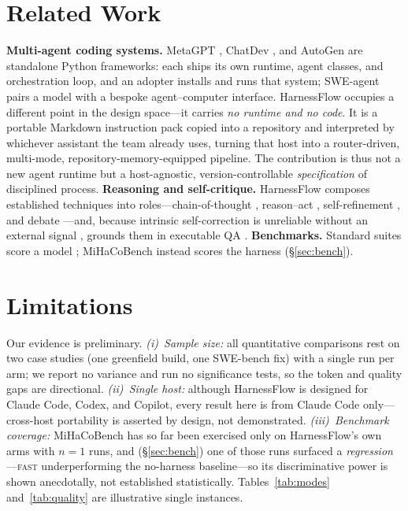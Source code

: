 \documentclass{article}
\begin{document}
\section{Related Work}

\textbf{Multi-agent coding systems.} MetaGPT \citep{hong2024metagpt}, ChatDev
\citep{qian2024chatdev}, and AutoGen \citep{wu2023autogen} are standalone Python
frameworks: each ships its own runtime, agent classes, and orchestration loop,
and an adopter installs and runs that system; SWE-agent \citep{yang2024sweagent}
pairs a model with a bespoke agent--computer interface. HarnessFlow occupies a
different point in the design space---it carries \emph{no runtime and no code}. It
is a portable Markdown instruction pack copied into a repository and interpreted
by whichever assistant the team already uses, turning that host into a
router-driven, multi-mode, repository-memory-equipped pipeline. The contribution
is thus not a new agent runtime but a host-agnostic, version-controllable
\emph{specification} of disciplined process. \textbf{Reasoning and self-critique.}
HarnessFlow composes established techniques into roles---chain-of-thought
\citep{wei2022chain,wang2023selfconsistency}, reason--act \citep{yao2023react},
self-refinement \citep{madaan2023selfrefine,shinn2023reflexion}, and debate
\citep{du2023debate}---and, because intrinsic self-correction is unreliable
without an external signal \citep{huang2024selfcorrect,olausson2024selfrepair},
grounds them in executable QA \citep{chen2023selfdebug}. \textbf{Benchmarks.}
Standard suites score a model \citep{chen2021codex,austin2021mbpp,jain2024livecodebench};
MiHaCoBench instead scores the harness (\S\ref{sec:bench}).

\section{Limitations}

Our evidence is preliminary. \emph{(i)~Sample size:} all quantitative comparisons
rest on two case studies (one greenfield build, one SWE-bench fix) with a single
run per arm; we report no variance and run no significance tests, so the token and
quality gaps are directional. \emph{(ii)~Single host:} although HarnessFlow is
designed for Claude Code, Codex, and Copilot, every result here is from Claude
Code only---cross-host portability is asserted by design, not demonstrated.
\emph{(iii)~Benchmark coverage:} MiHaCoBench has so far been exercised only on
HarnessFlow's own arms with $n{=}1$ runs, and (\S\ref{sec:bench}) one of those
runs surfaced a \emph{regression}---\textsc{fast} underperforming the no-harness
baseline---so its discriminative power is shown anecdotally, not established
statistically. Tables~\ref{tab:modes} and~\ref{tab:quality} are illustrative
single instances.
\end{document}
